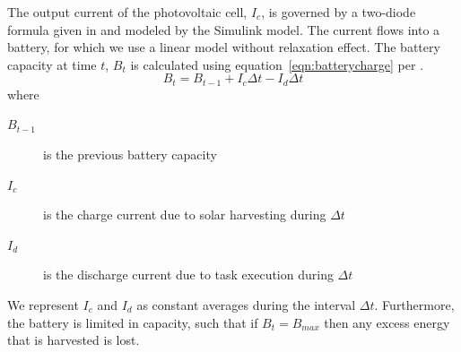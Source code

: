 The output current of the photovoltaic cell, $I_c$, is governed by a two-diode formula given in \cite{marwali1997probabilistic} and modeled by the Simulink model.  The current flows into a battery, for which we use a linear model without relaxation effect.  The battery capacity at time $t$, $B_t$ is calculated using equation~\ref{eqn:batterycharge} per \cite{niyato2007sleep}.
\begin{equation}
 B_t = B_{t-1} + I_c \Delta t - I_d \Delta t
\label{eqn:batterycharge}
\end{equation}
where 
\begin{description}
\item[$B_{t-1}$] is the previous battery capacity
\item[$I_c$] is the charge current due to solar harvesting during $\Delta t$
\item[$I_d$] is the discharge current due to task execution during $\Delta t$
\end{description}
We represent $I_c$ and $I_d$  as constant averages during the interval $\Delta t$. Furthermore, the battery is
limited in capacity, such that if $B_t = B_{max}$ then any excess energy that is harvested is lost.

